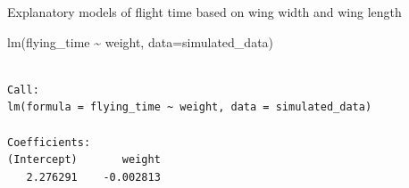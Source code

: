 \documentclass[
  letterpaper,
  DIV=11,
  numbers=noendperiod]{scrartcl}
\newenvironment{Shaded}{\begin{snugshade}}{\end{snugshade}}
\newcommand{\AttributeTok}[1]{\textcolor[rgb]{0.40,0.45,0.13}{#1}}
\newcommand{\FunctionTok}[1]{\textcolor[rgb]{0.28,0.35,0.67}{#1}}
\newcommand{\NormalTok}[1]{\textcolor[rgb]{0.00,0.23,0.31}{#1}}
\newcommand{\SpecialCharTok}[1]{\textcolor[rgb]{0.37,0.37,0.37}{#1}}
\begin{document}
\begin{table}

\caption{\label{tbl-modelresults}Explanatory models of flight time based
on wing width and wing length}


\end{table}%

\begin{Shaded}
\begin{Highlighting}[]
\FunctionTok{lm}\NormalTok{(flying\_time }\SpecialCharTok{\textasciitilde{}}\NormalTok{ weight, }\AttributeTok{data=}\NormalTok{simulated\_data)}
\end{Highlighting}
\end{Shaded}

\begin{verbatim}

Call:
lm(formula = flying_time ~ weight, data = simulated_data)

Coefficients:
(Intercept)       weight  
   2.276291    -0.002813  
\end{verbatim}
\end{document}
